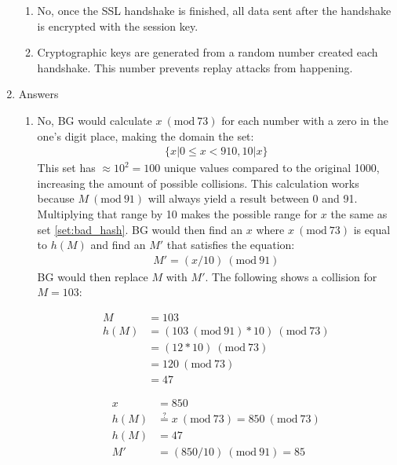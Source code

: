 \documentclass{article}
\newcommand{\Mod}[1]{\ (\mathrm{mod}\ #1)}
\begin{document}
\begin{enumerate}
\begin{enumerate}
        \item No, once the SSL handshake is finished, all data sent after the handshake is encrypted with the session key.

        \item Cryptographic keys are generated from a random number created each handshake. This number prevents replay attacks from happening.
        
    \end{enumerate}

    \item Answers
    \begin{enumerate}
        
        \item No, BG would calculate $x \Mod{73}$ for each number with a zero in the one's digit place, making the domain the set:
        \begin{align}\label{set:bad_hash}
            \{x | 0 \leq x < 910, 10 | x\}
        \end{align} 
        This set has $\approx 10^2 = 100$ unique values compared to the original 1000, increasing the amount of possible collisions. This calculation works because $M \Mod{91}$ will always yield a result between 0 and 91. Multiplying that range by 10 makes the possible range for $x$ the same as set \ref{set:bad_hash}. BG would then find an $x$ where $x \Mod{73}$ is equal to $h(M)$ and find an $M'$ that satisfies the equation:
        \begin{align*}
            M' = (x / 10) \Mod{91}
        \end{align*} 
        BG would then replace $M$ with $M'$. 
        The following shows a collision for $M = 103$:
        
        \begin{align*}
            M &= 103\\
            h(M) &= (103 \Mod{91} * 10) \Mod{73}\\
            &= (12 * 10) \Mod{73}\\
            &= 120 \Mod{73}\\
            &= 47
        \end{align*}
        
        \begin{align*}
            x &= 850 \\
            h(M) &\stackrel{?}{=} x \Mod{73} = 850 \Mod{73}\\
            h(M) &= 47 \\
            M' &= (850 / 10) \Mod{91} = 85
        \end{align*}

    \end{enumerate}
\end{enumerate}    
\end{document}
